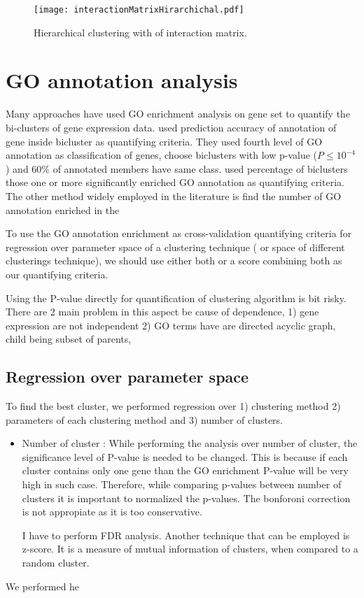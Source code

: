 \documentclass{article}
\begin{document}
\begin{figure}[ht]
	\begin{center}
		\texttt{[image: interactionMatrixHirarchichal.pdf]}
	\end{center}
	\caption{Hierarchical clustering with of interaction matrix.}
	\label{fig:intMH}
\end{figure}



\section{GO annotation analysis}
Many approaches have used GO enrichment analysis on gene set to quantify the bi-clusters of gene expression data. \cite{tanay2002discovering} used prediction accuracy of annotation of gene inside bicluster as quantifying criteria. They used 
fourth level of GO annotation as classification of genes, choose biclusters with low p-value ($P \le 10^{-4}$) and 
60\% of annotated members have same class. \cite{prelic2006systematic} used percentage of biclusters those one or more 
significantly enriched GO annotation as quantifying criteria.  The other method widely employed in the literature is find the 
number of GO annotation enriched in the 

To use the GO annotation enrichment as cross-validation quantifying criteria for regression over parameter space of
a clustering technique ( or space of different clusterings technique), we should use either both or a score combining both as our
quantifying criteria.


Using the P-value directly for quantification of clustering algorithm is bit risky. There are 2 main problem in this aspect be cause of dependence,
1) gene expression are not independent 2) GO terms have are directed acyclic graph, child being subset of parents, 

\subsection{Regression over parameter space}
To find the best cluster, we performed regression over 1) clustering method 2) parameters of each clustering method and 3) number of clusters.

\begin{itemize}
	\item Number of cluster : While performing the analysis over number of cluster, the significance level of P-value is needed to be
		changed. This is because if each cluster contains only one gene than the GO enrichment P-value will be very high in 
		such case. Therefore, while comparing p-values between number of clusters it is important to normalized the p-values.
		The bonforoni correction is not appropiate as it is too conservative.
		
		\par I have to perform FDR analysis. Another technique
		that can be employed is z-score. It is a measure of mutual information of clusters, when compared to a random cluster. 
\end{itemize}
We performed he




\end{document}
